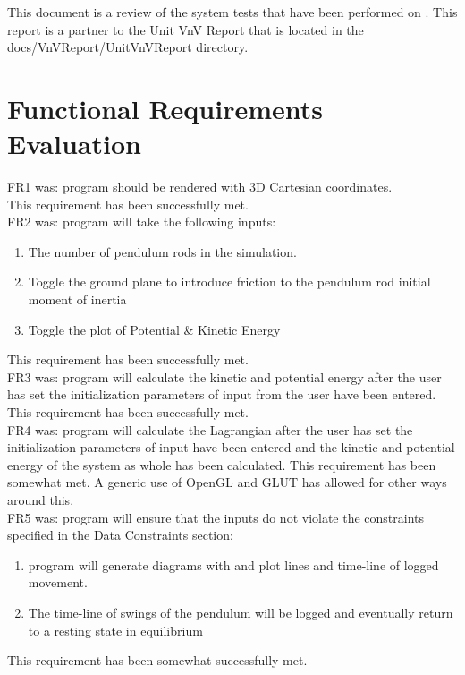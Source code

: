 \documentclass[12pt, titlepage]{article}
\begin{document}
\newpage

\tableofcontents

\listoftables %

\listoffigures %

\newpage



This document is a review of the system tests that have been performed on 
\progname{}. This report is a partner to the Unit VnV Report that is located in 
the docs/VnVReport/UnitVnVReport directory.

\section{Functional Requirements Evaluation}

FR1 was: \progname program should be rendered with 3D Cartesian coordinates. \\
This requirement has been successfully met.\\

\noindent FR2 was: \progname program 
  will take the following inputs: 
  \begin{enumerate}
   \item The number of pendulum rods in the simulation. 
   \item Toggle the ground plane to introduce friction to the
   pendulum rod initial moment of inertia
   \item Toggle the plot of Potential \& Kinetic Energy
  \end{enumerate}
 This requirement has been successfully met.\\
                    
FR3 was: \progname program 
will calculate the kinetic and potential energy after the user has set the 
initialization parameters of input from the user have been entered.\\
This requirement has been successfully met.\\

FR4 was: \progname program 
will calculate the Lagrangian after the user has set the initialization 
parameters of input have been entered and the kinetic and potential energy of 
the system as whole has been calculated.
This requirement has been somewhat met. A generic use of OpenGL and GLUT
has allowed for other ways around this.\\

FR5 was: \progname program
will ensure that the inputs do not violate the constraints specified in the 
Data Constraints section:
    \begin{enumerate} \item \progname program will 
generate diagrams with and plot lines and time-line of logged movement. 
\item The time-line of swings of the pendulum will be logged and eventually
return to a resting state in equilibrium
\end{enumerate} 
This requirement has been somewhat successfully met.\\
\end{document}
